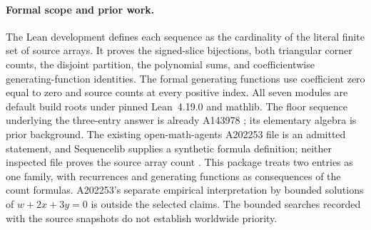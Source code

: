 \paragraph{Formal scope and prior work.}
The Lean development defines each sequence as the cardinality of the
literal finite set of source arrays. It proves the signed-slice
bijections, both triangular corner counts, the disjoint partition,
the polynomial sums, and coefficientwise generating-function
identities. The formal generating functions use coefficient zero
equal to zero and source counts at every positive index. All seven
modules are default build roots under pinned Lean~4.19.0 and mathlib.
The floor sequence underlying the three-entry answer is already
A143978 \cite{a202253-floor}; its elementary algebra is prior
background. The existing open-math-agents A202253 file is an admitted
statement, and Sequencelib supplies a synthetic formula definition;
neither inspected file proves the source array count
\cite{a202253-oma,a202253-sequencelib}. This package treats two entries
as one family, with recurrences and generating functions as
consequences of the count formulas. A202253's separate empirical
interpretation by bounded solutions of $w+2x+3y=0$ is outside the
selected claims. The bounded searches recorded with the source
snapshots do not establish worldwide priority.
